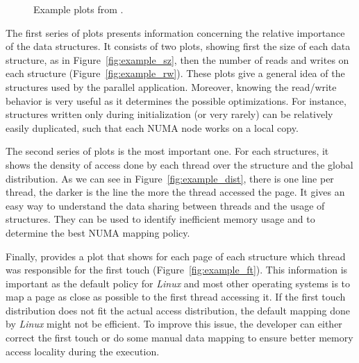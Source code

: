 \begin{figure}[htb]
    \centering
    \label{fig:example_plot1}
    \caption{Example plots from \TABARNAC.}
\end{figure}

The first series of plots presents information concerning the relative
importance of the data structures. It consists of two plots, showing first the
size of each data structure, as in Figure~\ref{fig:example_sz}, then the
number of reads and writes  on each structure (Figure~\ref{fig:example_rw}). These plots give a
general idea of the structures used by the parallel application.
Moreover, knowing the read/write behavior is very
useful as it determines the possible optimizations. For instance, structures
written only during initialization (or very rarely) can be relatively easily
duplicated, such that each NUMA node works on a local copy.

The second series of plots is the most important one. For each structures, it
shows the density of access done by each thread over the structure and the
global distribution. As we can see in Figure~\ref{fig:example_dist}, there is
one line per thread, the darker is the line the more the thread accessed the
page. It gives an easy way to understand the data sharing between threads and
the usage of structures. They can be used to identify inefficient memory usage
and to determine the best NUMA mapping policy.



Finally, \TABARNAC provides a plot that shows for each page of each structure
which thread was responsible for the first touch
(Figure~\ref{fig:example_ft}). This information is important as the
default policy for \emph{Linux} and most other operating systems is to map a page as close as possible to the first
thread accessing it. If the first touch distribution does not fit the actual
access distribution, the default mapping done by \emph{Linux} might not be
efficient. To improve this issue, the developer can either correct the first
touch or do some manual data mapping to ensure better memory access locality
during the execution.
